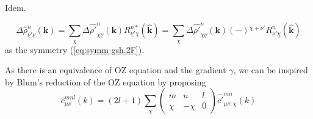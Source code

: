 Idem.

\begin{equation}
\Delta\hat{\rho}_{\underline{\nu'}\underline{\nu}}^{n}(\mathbf{k})=\sum_{\chi}\Delta\hat{\rho'}_{\chi\underline{\nu}}^{n}(\mathbf{k})R_{\underline{\nu'}\chi}^{n*}(\hat{\mathbf{k}})=\sum_{\chi}\Delta\hat{\rho'}_{\chi\underline{\nu}}^{n}(\mathbf{k})\left(-\right){}^{\chi+\nu'}R_{\nu'\underline{\chi}}^{n}(\hat{\mathbf{k}})\label{eq:rho-p.2F}
\end{equation}
as the symmetry (\ref{eq:symm-gsh.2F}).

As there is an equivalence of \acs{OZ} equation and the gradient
$\gamma$, we can be inspired by Blum's reduction of the \acs{OZ}
equation \citep{Blum_II} by proposing
\begin{equation}
\hat{c}_{\mu\nu}^{mnl}(k)=\left(2l+1\right)\sum_{\chi}\left(\begin{array}{ccc}
m & n & l\\
\chi & -\chi & 0
\end{array}\right)\hat{c'}_{\mu\nu,\chi}^{mn}(k)\label{eq:c-p.2F}
\end{equation}

